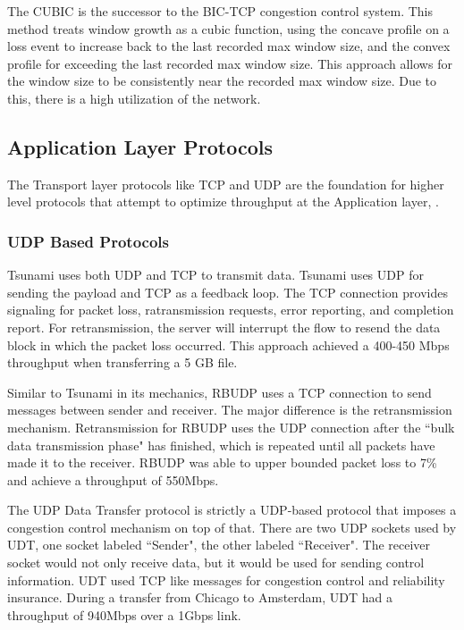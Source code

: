 The CUBIC \cite{ha2008cubic} is the successor to the BIC-TCP congestion control system. This method treats window growth as a cubic function, using the concave profile on a loss event to increase back to the last recorded max window size, and the convex profile for exceeding the last recorded max window size. This approach allows for the window size to be consistently near the recorded max window size. Due to this, there is a high utilization of the network.

\subsection{Application Layer Protocols}

The Transport layer protocols like TCP and UDP are the foundation for higher level protocols that attempt to optimize throughput at the Application layer, \cite{Fan2010}\cite{Allman1997}\cite{Allman1995}\cite{Aspera2016} \cite{Meiss2007}\cite{gu2007udt}\cite{lai2009designing}\cite{He2002}\cite{Sivakumar2000psockets}.

\subsubsection{UDP Based Protocols}

Tsunami \cite{Meiss2007} uses both UDP and TCP to transmit data. Tsunami uses UDP for sending the payload and TCP as a feedback loop. The TCP connection provides signaling for packet loss, ratransmission requests, error reporting, and completion report. For retransmission, the server will interrupt the flow to resend the data block in which the packet loss occurred. This approach achieved a 400-450 Mbps throughput when transferring a 5 GB file.

Similar to Tsunami in its mechanics, RBUDP \cite{He2002} uses a TCP connection to send messages between sender and receiver. The major difference is the retransmission mechanism. Retransmission for RBUDP uses the UDP connection after the ``bulk data transmission phase" has finished, which is repeated until all packets have made it to the receiver. RBUDP was able to upper bounded packet loss to 7\% and achieve a throughput of 550Mbps.

The UDP Data Transfer protocol \cite{gu2007udt} is strictly a UDP-based protocol that imposes a congestion control mechanism on top of that. There are two UDP sockets used by UDT, one socket labeled ``Sender", the other labeled ``Receiver". The receiver socket would not only receive data, but it would be used for sending control information. UDT used TCP like messages for congestion control and reliability insurance. During a transfer from Chicago to Amsterdam, UDT had a throughput of 940Mbps over a 1Gbps link.

